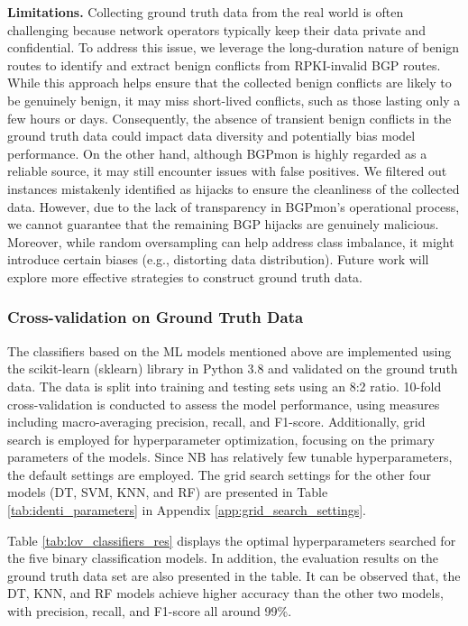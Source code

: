 \noindent\textbf{Limitations.}
Collecting ground truth data from the real world is often challenging because network operators typically keep their data private and confidential. To address this issue, we leverage the long-duration nature of benign routes to identify and extract benign conflicts from RPKI-invalid BGP routes. While this approach helps ensure that the collected benign conflicts are likely to be genuinely benign, it may miss short-lived conflicts, such as those lasting only a few hours or days. Consequently, the absence of transient benign conflicts in the ground truth data could impact data diversity and potentially bias model performance. On the other hand, although BGPmon is highly regarded as a reliable source, it may still encounter issues with false positives. We filtered out instances mistakenly identified as hijacks to ensure the cleanliness of the collected data. However, due to the lack of transparency in BGPmon’s operational process, we cannot guarantee that the remaining BGP hijacks are genuinely malicious. Moreover, while random oversampling can help address class imbalance, it might introduce certain biases (e.g., distorting data distribution). Future work will explore more effective strategies to construct ground truth data.
\vspace{-5pt}
\subsubsection{Cross-validation on Ground Truth Data}
The classifiers based on the ML models mentioned above are implemented using the scikit-learn (sklearn) library in Python 3.8 and validated on the ground truth data.
The data is split into training and testing sets using an 8:2 ratio. 10-fold cross-validation is conducted to assess the model performance, using measures including macro-averaging precision, recall, and F1-score.
Additionally, grid search is employed for hyperparameter optimization, focusing on the primary parameters of the models. Since NB has relatively few tunable hyperparameters, the default settings are employed.
The grid search settings for the other four models (DT, SVM, KNN, and RF) are presented in Table \ref{tab:identi_parameters} in Appendix \ref{app:grid_search_settings}.

Table \ref{tab:lov_classifiers_res} displays the optimal hyperparameters searched for the five binary classification models. In addition, the evaluation results on the ground truth data set are also presented in the table. It can be observed that, the DT, KNN, and RF models achieve higher accuracy than the other two models, with precision, recall, and F1-score all around 99\%. 


